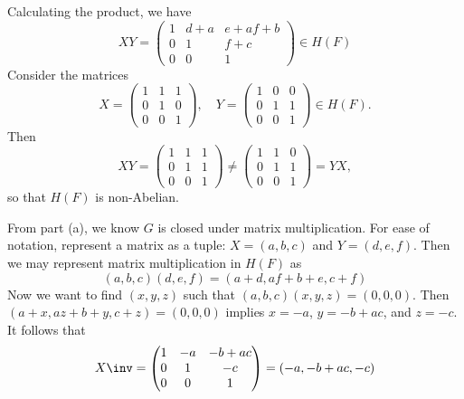 \begin{solenum}
    \item Calculating the product, we have
    \[
        XY = 
        \begin{pmatrix}
            1 & d + a & e + af + b \\
            0 & 1 & f + c \\
            0 & 0 & 1
        \end{pmatrix} \in H(F)
    \]
    Consider the matrices
    \[
        X =
        \begin{pmatrix}
            1 & 1 & 1 \\
            0 & 1 & 0 \\
            0 & 0 & 1
        \end{pmatrix}, \quad
        Y =
        \begin{pmatrix}
            1 & 0 & 0 \\
            0 & 1 & 1 \\
            0 & 0 & 1
        \end{pmatrix} \in H(F).
    \]
    Then
    \[
        XY =
        \begin{pmatrix}
            1 & 1 & 1 \\
            0 & 1 & 1 \\
            0 & 0 & 1
        \end{pmatrix} \neq
        \begin{pmatrix}
            1 & 1 & 0 \\
            0 & 1 & 1 \\
            0 & 0 & 1
        \end{pmatrix} = YX,
    \]
    so that $H(F)$ is non-Abelian.
    \item From part (a), we know $G$ is closed under matrix multiplication.
	For ease of notation, represent a matrix as a tuple: $X = (a, b, c)$ and $Y = (d, e, f)$.
	Then we may represent matrix multiplication in $H(F)$ as
    \[
    	(a, b, c)(d, e, f) = (a + d, af + b + e, c + f)
    \]
    Now we want to find $(x, y, z)$ such that $(a, b, c)(x, y, z) = (0, 0, 0)$.
	Then $(a + x, az + b + y, c + z) = (0, 0, 0)$ implies $x = -a$, $y = -b + ac$, and $z = -c$.
	It follows that
    \[
        X\inv = 
        \begin{pmatrix}
            1 & -a & -b + ac \\
            0 & 1 & -c \\
            0 & 0 & 1
        \end{pmatrix} = (-a, -b + ac, -c)
    \]

\end{solenum}
